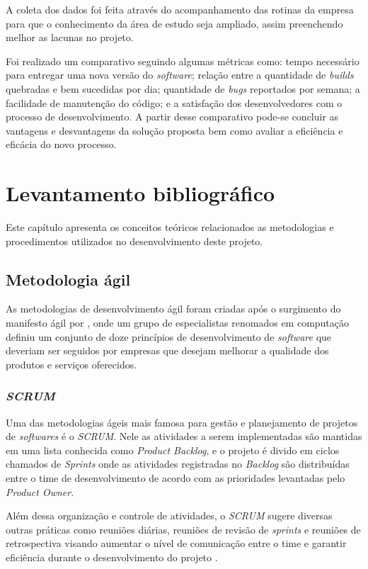 \documentclass[
	12pt,				%
	openright,			%
	oneside,			%
	a4paper,			%
	english,			%
	french,				%
	spanish,			%
	brazil,				%
	]{abntex2}
\begin{document}
A coleta dos dados foi feita através do acompanhamento das rotinas da empresa para que o conhecimento da área de estudo seja ampliado, assim preenchendo melhor as lacunas no projeto.

Foi realizado um comparativo seguindo algumas métricas como: tempo necessário para entregar uma nova versão do \textit{software}; relação entre a quantidade de \textit{builds} quebradas e bem sucedidas por dia; quantidade de \textit{bugs} reportados por semana; a facilidade de manutenção do código; e a satisfação dos desenvolvedores com o processo de desenvolvimento. A partir desse comparativo pode-se concluir as vantagens e desvantagens da solução proposta bem como avaliar a eficiência e eficácia do novo processo.

\chapter{Levantamento bibliográfico}

Este capítulo apresenta os conceitos teóricos relacionados as metodologias e procedimentos utilizados no desenvolvimento deste projeto.

\section{Metodologia ágil}

As metodologias de desenvolvimento ágil foram criadas após o surgimento do manifesto ágil por , onde um grupo de especialistas renomados em computação definiu um conjunto de doze princípios de desenvolvimento de \textit{software} que deveriam ser seguidos por empresas que desejam melhorar a qualidade dos produtos e serviços oferecidos.

\subsection{\textit{SCRUM}}

Uma das metodologias ágeis mais famosa para gestão e planejamento de projetos de \textit{softwares} é o \textit{SCRUM}. Nele as atividades a serem implementadas são mantidas em uma lista conhecida como \textit{Product Backlog}, e o projeto é divido em ciclos chamados de \textit{Sprints} onde as atividades registradas no \textit{Backlog} são distribuídas entre o time de desenvolvimento de acordo com as prioridades levantadas pelo \textit{Product Owner}.

Além dessa organização e controle de atividades, o \textit{SCRUM} sugere diversas outras práticas como reuniões diárias, reuniões de revisão de \textit{sprints} e reuniões de retrospectiva visando aumentar o nível de comunicação entre o time e garantir eficiência durante o desenvolvimento do projeto \cite{Agil:SCRUM}.
\end{document}
